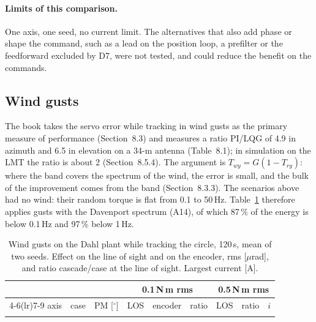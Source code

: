 \documentclass[10pt,a4paper]{article}
\numberwithin{equation}{section}
\begin{document}
\paragraph{Limits of this comparison.} One axis, one seed, no current limit. The alternatives that also add phase or shape the command, such as a lead on the position loop, a prefilter or the feedforward excluded by D7, were not tested, and could reduce the benefit on the commands.

\subsection{Wind gusts}\label{sec:wind}
The book takes the servo error while tracking in wind gusts as the primary measure of performance (Section~8.3) and measures a ratio PI/LQG of 4.9 in azimuth and 6.5 in elevation on a 34-m antenna (Table~8.1); in simulation on the LMT the ratio is about 2 (Section~8.5.4). The argument is $T_{wy}=G(1-T_{ry})$: where the band covers the spectrum of the wind, the error is small, and the bulk of the improvement comes from the band (Section~8.3.3). The scenarios above had no wind: their random torque is flat from 0.1 to 50\,Hz. Table~\ref{tab:wind} therefore applies gusts with the Davenport spectrum (A14), of which 87\,\% of the energy is below 0.1\,Hz and 97\,\% below 1\,Hz.

\begin{table}[H]\centering\footnotesize\setlength{\tabcolsep}{4pt}
\caption{Wind gusts on the Dahl plant while tracking the circle, 120\,s, mean of two seeds. Effect on the line of sight and on the encoder, rms [$\mu$rad], and ratio cascade/case at the line of sight. Largest current [A].}\label{tab:wind}
\begin{tabular}{llrrrrrrr}\toprule
& & & \multicolumn{3}{c}{0.1\,N\,m rms} & \multicolumn{3}{c}{0.5\,N\,m rms} \\
\cmidrule(lr){4-6}\cmidrule(lr){7-9}
axis & case & PM [$^\circ$] & LOS & encoder & ratio & LOS & ratio & $i$ \\ \midrule
\\ \bottomrule
\end{tabular}\end{table}
\end{document}
